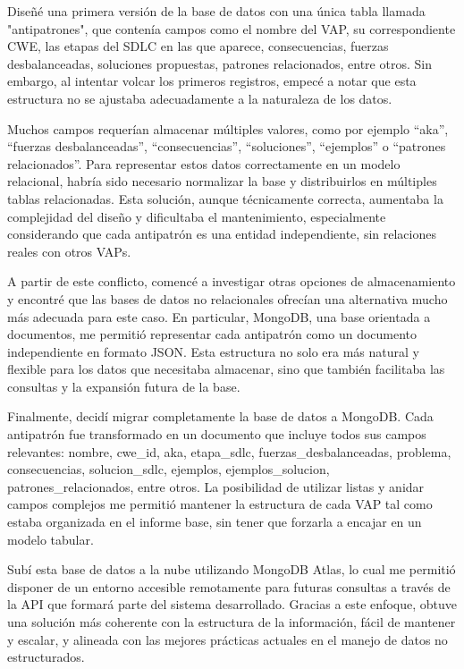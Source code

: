 Diseñé una primera versión de la base de datos con una única tabla llamada "antipatrones", que contenía campos como el nombre del VAP, su correspondiente CWE, las etapas del SDLC en las que aparece, consecuencias, fuerzas desbalanceadas, soluciones propuestas, patrones relacionados, entre otros. Sin embargo, al intentar volcar los primeros registros, empecé a notar que esta estructura no se ajustaba adecuadamente a la naturaleza de los datos.

Muchos campos requerían almacenar múltiples valores, como por ejemplo “aka”, “fuerzas desbalanceadas”, “consecuencias”, “soluciones”, “ejemplos” o “patrones relacionados”. Para representar estos datos correctamente en un modelo relacional, habría sido necesario normalizar la base y distribuirlos en múltiples tablas relacionadas. Esta solución, aunque técnicamente correcta, aumentaba la complejidad del diseño y dificultaba el mantenimiento, especialmente considerando que cada antipatrón es una entidad independiente, sin relaciones reales con otros VAPs.

A partir de este conflicto, comencé a investigar otras opciones de almacenamiento y encontré que las bases de datos no relacionales ofrecían una alternativa mucho más adecuada para este caso. En particular, MongoDB, una base orientada a documentos, me permitió representar cada antipatrón como un documento independiente en formato JSON. Esta estructura no solo era más natural y flexible para los datos que necesitaba almacenar, sino que también facilitaba las consultas y la expansión futura de la base.

Finalmente, decidí migrar completamente la base de datos a MongoDB. Cada antipatrón fue transformado en un documento que incluye todos sus campos relevantes: nombre, cwe\_id, aka, etapa\_sdlc, fuerzas\_desbalanceadas, problema, consecuencias, solucion\_sdlc, ejemplos, ejemplos\_solucion, patrones\_relacionados, entre otros. La posibilidad de utilizar listas y anidar campos complejos me permitió mantener la estructura de cada VAP tal como estaba organizada en el informe base, sin tener que forzarla a encajar en un modelo tabular.

Subí esta base de datos a la nube utilizando MongoDB Atlas, lo cual me permitió disponer de un entorno accesible remotamente para futuras consultas a través de la API que formará parte del sistema desarrollado. Gracias a este enfoque, obtuve una solución más coherente con la estructura de la información, fácil de mantener y escalar, y alineada con las mejores prácticas actuales en el manejo de datos no estructurados.


